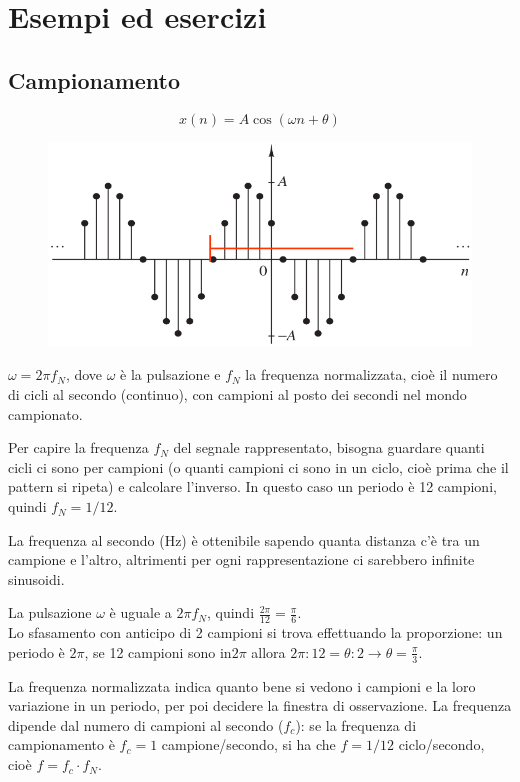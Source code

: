 \newpage
\section{Esempi ed esercizi}


\subsection{Campionamento}
$$x(n) = A\cos(\omega n + \theta)$$
\begin{figure}[h]
	\centering
	\includegraphics[scale=0.56]{Lezioni/Immagini/esempio1}
\end{figure}

$\omega = 2\pi f_N$, dove $\omega$ è la pulsazione e $f_N$ la frequenza normalizzata, cioè il numero di cicli al secondo (continuo), con campioni al posto dei secondi nel mondo campionato.

Per capire la frequenza $f_N$ del segnale rappresentato, bisogna guardare quanti cicli ci sono per campioni (o quanti campioni ci sono in un ciclo, cioè prima che il pattern si ripeta) e calcolare l'inverso. In questo caso un periodo è 12 campioni, quindi $f_N = 1/12$.

La frequenza al secondo (Hz) è ottenibile sapendo quanta distanza c'è tra un campione e l'altro, altrimenti per ogni rappresentazione ci sarebbero infinite sinusoidi.

La pulsazione $\omega$ è uguale a $2\pi f_N$, quindi $\frac{2\pi}{12} = \frac{\pi}{6}$. \\
Lo sfasamento con anticipo di 2 campioni si trova effettuando la proporzione: un periodo è $2\pi$, se 12 campioni sono in$2\pi$ allora $2\pi : 12 = \theta : 2 \rightarrow \theta = \frac{\pi}{3}$.

La frequenza normalizzata indica quanto bene si vedono i campioni e la loro variazione in un periodo, per poi decidere la finestra di osservazione. La frequenza dipende dal numero di campioni al secondo ($f_c$): se la frequenza di campionamento è $f_c = 1$ campione/secondo, si ha che $f = 1/12$ ciclo/secondo, cioè $f = f_c \cdot f_N$.

